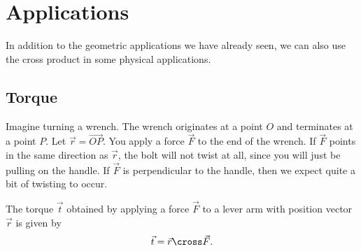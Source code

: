 \documentclass{ximera}
\begin{document}
\section{Applications}

In addition to the geometric applications we have already seen, we can
also use the cross product in some physical applications.



\subsection{Torque}

Imagine turning a wrench.  The wrench originates at a point $O$ and
terminates at a point $P$.  Let $\vec{r} = \overrightarrow{OP}$.  You
apply a force $\vec{F}$ to the end of the wrench.  If $\vec{F}$ points
in the same direction as $\vec{r}$, the bolt will not twist at all,
since you will just be pulling on the handle.  If $\vec{F}$ is
perpendicular to the handle, then we expect quite a bit of twisting to
occur.

\begin{definition}
  The torque $\vec{t}$ obtained by applying a force $\vec{F}$ to a
  lever arm with position vector $\vec{r}$ is given by
  \[
  \vec{t} = \vec{r} \cross \vec{F}. 
  \]
\end{definition}
\end{document}
